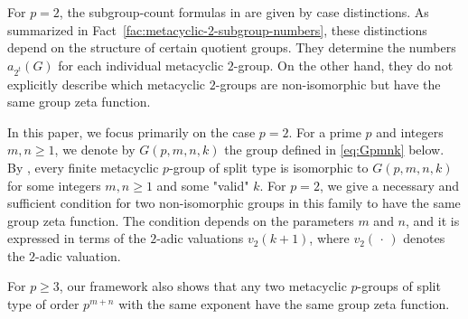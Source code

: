 \documentclass[onecolumn]{article}
\numberwithin{equation}{section}
\theoremstyle{mytheoremstyle}
\begin{document}
For $p=2$, the subgroup-count formulas in \cite{Berkovich2011} are given by case distinctions.
As summarized in Fact~\ref{fac:metacyclic-2-subgroup-numbers}, these distinctions depend on the structure of certain quotient groups.
They determine the numbers $a_{2^{t}}(G)$ for each individual metacyclic $2$-group.
On the other hand, they do not explicitly describe which metacyclic $2$-groups are non-isomorphic
but have the same group zeta function.

In this paper, we focus primarily on the case $p=2$.
For a prime $p$ and integers $m,n\ge 1$, we denote by $G(p,m,n,k)$ the group defined in \eqref{eq:Gpmnk} below.
By \cite{Hempel2000}, every finite metacyclic $p$-group of split type is isomorphic to $G(p,m,n,k)$
for some integers $m,n\ge 1$ and some "valid" $k$.
For $p=2$, we give a necessary and sufficient condition for two non-isomorphic groups in this family
to have the same group zeta function.
The condition depends on the parameters $m$ and $n$, and it is expressed in terms of the $2$-adic valuations
$v_{2}(k+1)$, where $v_{2}(\,\cdot\,)$ denotes the $2$-adic valuation.

For $p\ge 3$, our framework also shows that any two metacyclic $p$-groups of split type
of order $p^{m+n}$ with the same exponent have the same group zeta function.
\end{document}
